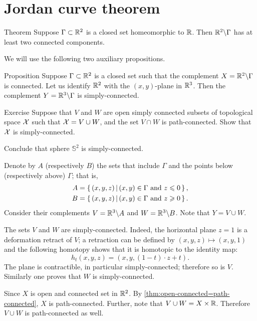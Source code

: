 \chapter{Jordan curve theorem}

\begin{thm}{Theorem}\label{thm:proper-jordan}
Suppose $\Gamma\subset\mathbb{R}^2$ is a closed set homeomorphic to $\mathbb{R}$.
Then $\mathbb{R}^2\backslash \Gamma$ has at least two connected components.
\end{thm}

We will use the following two auxiliary propositions.

\begin{thm}{Proposition}\label{prop:c/sc}
Suppose $\Gamma\subset\mathbb{R}^2$ is a closed set such that the complement $X=\mathbb{R}^2\backslash \Gamma$ is connected.
Let us identify $\mathbb{R}^2$ with the $(x,y)$-plane in $\mathbb{R}^3$.
Then the complement $Y=\mathbb{R}^3\backslash \Gamma$ is simply-connected.
\end{thm}

\begin{thm}{Exercise}\label{ex:sc-VuW}
Suppose that $V$ and $W$ are open simply connected subsets of topological space $\mathcal{X}$ such that 
$\mathcal{X}=V\cup W$, and the set $V\cap W$ is path-connected.
Show that $\mathcal{X}$ is simply-connected.

Conclude that sphere $\mathbb{S}^2$ is simply-connected.
\end{thm}

Denote by $A$ (respectively $B$) the sets that include $\Gamma$ and the points below (respectively above) $\Gamma$;
that is,
\begin{align*}
A&=\left\{\,{(x,y,z)}\,\middle|\,{(x,y)\in\Gamma\ \text{and}\ z\leqslant 0}\,\right\},
\\
B&=\left\{\,{(x,y,z)}\,\middle|\,{(x,y)\in\Gamma\ \text{and}\ z\geqslant 0}\,\right\}.
\end{align*}
Consider their complements $V=\mathbb{R}^3\backslash A$ and $W=\mathbb{R}^3\backslash B$.
Note that $Y=V\cup W$.

The sets $V$ and $W$ are simply-connected.
Indeed, the horizontal plane $z= 1$ is a deformation retract of $V$;
a retraction can be defined by $(x,y,z)\mapsto (x,y,1)$ and the following homotopy shows that it is homotopic to the identity map: 
\[h_t(x,y,z)=(x,y,(1-t)\cdot z+t).\]
The plane is contractible, in particular simply-connected; therefore so is $V$.
Similarly one proves that $W$ is simply-connected.


Since $X$ is open and connected set in $\mathbb{R}^2$.
By \ref{thm:open-connected=path-connected}, $X$ is path-connected.
Further, note that $V\cup W=X\times \mathbb{R}$.
Therefore $V\cup W$ is path-connected as well.

